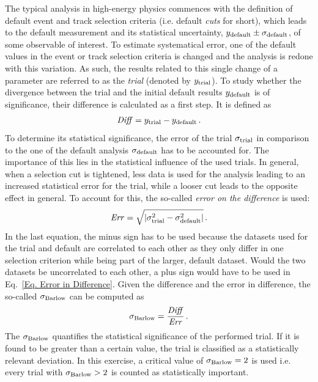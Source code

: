 \documentclass[11pt]{article}
\begin{document}
The typical analysis in high-energy physics commences with the definition of default event and track selection criteria (i.e. default \textit{cuts} for short), which leads to the default measurement and its statistical uncertainty, $y_{\rm default} \pm \sigma_{\rm default}$, of some observable of interest. To estimate systematical error, one of the default values in the event or track selection criteria is changed and the analysis is redone with this variation. As such, the results related to this single change of a parameter are referred to as the \textit{trial} (denoted by $y_{\rm trial}$). To study whether the divergence between the trial and the initial default results $y_{\rm default}$ is of significance, their difference is calculated as a first step. It is defined as 
%
\begin{equation}
	\mathit{Diff} = y_{\rm trial} - y_{\rm default} \,.
\end{equation} 
%
To determine its statistical significance, the error of the trial $\sigma_{\rm trial}$ in comparison to the one of the default analysis $\sigma_{\rm default}$ has to be accounted for. The importance of this lies in the statistical influence of the used trials. In general, when a selection cut is tightened, less data is used for the analysis leading to an increased statistical error for the trial, while a looser cut leads to the opposite effect in general. To account for this, the so-called \textit{error on the difference} is used:
%
\begin{equation}
	\mathit{Err} = \sqrt{\left| \sigma_{\rm trial}^2 - \sigma_{\rm default}^2\right|} \,.\label{Eq. Error in Difference}
\end{equation}
%
In the last equation, the minus sign has to be used because the datasets used for the trial and default are correlated to each other as they only differ in one selection criterion while being part of the larger, default dataset. Would the two datasets be uncorrelated to each other, a plus sign would have to be used in Eq.~\eqref{Eq. Error in Difference}.
Given the difference and the error in difference, the so-called $\sigma_{\rm Barlow}$ can be computed as 
%
\begin{equation}
	\sigma_{\rm Barlow} = \frac{\mathit{Diff}}{\mathit{Err}} \,.
	\label{eq:barlow}
\end{equation}
%
The $\sigma_{\rm Barlow}$ quantifies the statistical significance of the performed trial. If it is found to be greater than a certain value, the trial is classified as a statistically relevant deviation. In this exercise, a critical value of $\sigma_{\rm Barlow} = 2$ is used i.e. every trial with $\sigma_{\rm Barlow} > 2$ is counted as statistically important. 
\end{document}
